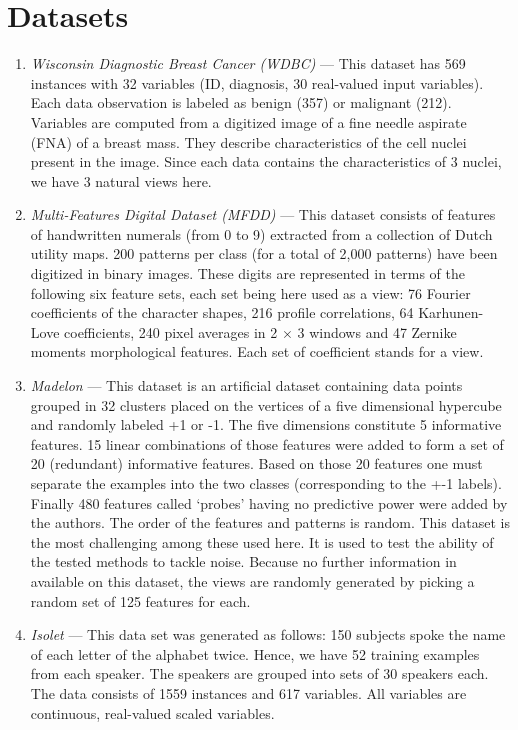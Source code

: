 
\chapter{Datasets} 
\label{sec:app-datasets}

	\begin{enumerate}
        \item \textit{Wisconsin Diagnostic Breast Cancer (WDBC)} --- This dataset has 569 instances with 32  variables (ID, diagnosis, 30 real-valued input variables). Each data observation is labeled as benign (357) or malignant (212). Variables are computed from a digitized image of a fine needle aspirate (FNA) of a breast mass.  They describe characteristics of the cell nuclei present in the image. Since each data contains the characteristics of 3 nuclei, we have 3 natural views here.\\
        \item \textit{Multi-Features Digital Dataset (MFDD)} --- This dataset consists of features of handwritten numerals (from 0 to 9) extracted from a collection of Dutch utility maps. 200 patterns per class (for a total of 2,000 patterns) have been digitized in binary images. These digits are represented in terms of the following six feature sets, each set being here used as a view: 76 Fourier coefficients of the character shapes, 216 profile correlations, 64 Karhunen-Love coefficients, 240 pixel averages in 2 $\times$ 3 windows and 47 Zernike moments morphological features. Each set of coefficient stands for a view.\\
        \item \textit{Madelon} --- This dataset is an artificial dataset containing data points grouped in 32 clusters placed on the vertices of a five dimensional hypercube and randomly labeled +1 or -1. The five dimensions constitute 5 informative features. 15 linear combinations of those features were added to form a set of 20 (redundant) informative features. Based on those 20 features one must separate the examples into the two classes (corresponding to the +-1 labels). Finally 480 features called `probes' having no predictive power were added by the authors. The order of the features and patterns is random. This dataset is the most challenging among these used here. It is used to test the ability of the tested methods to tackle noise. Because no further information in available on this dataset, the views are randomly generated by picking a random set of 125 features for each.\\
	\item \textit{Isolet} --- This data set was generated as follows: 150 subjects spoke the name of each letter of the alphabet twice. Hence, we have 52 training examples from each speaker. The speakers are grouped into sets of 30 speakers each. The data consists of 1559 instances and 617 variables. All variables are continuous, real-valued scaled variables.\\

\end{enumerate}
